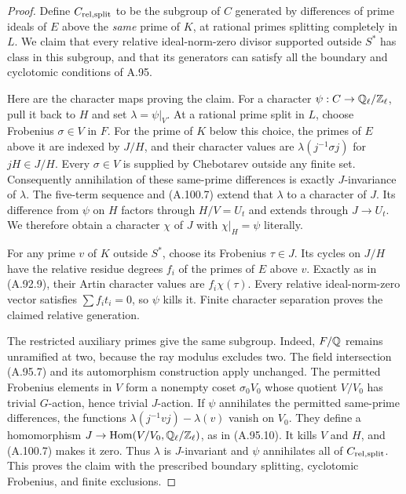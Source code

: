 \begin{proof}
Define $C_{\rm rel,split}$ to be the subgroup of $C$
generated by differences of prime ideals of $E$ above
the \emph{same} prime of $K$, at rational primes
splitting completely in $L$.
We claim that every relative ideal-norm-zero divisor
supported outside $S^*$ has class in this subgroup,
and that its generators can satisfy all the boundary
and cyclotomic conditions of A.95.

Here are the character maps proving the claim.
For a character $\psi:C\to\mathbb Q_\ell/\mathbb Z_\ell$, pull it
back to $H$ and set $\lambda=\psi|_V$.
At a rational prime split in $L$, choose Frobenius
$\sigma\in V$ in $F$.
For the prime of $K$ below this choice, the primes
of $E$ above it are indexed by $J/H$, and their
character values are
$\lambda(j^{-1}\sigma j)$ for $jH\in J/H$.
Every $\sigma\in V$ is supplied by Chebotarev outside
any finite set.
Consequently annihilation of these same-prime
differences is exactly $J$-invariance of $\lambda$.
The five-term sequence and (A.100.7) extend that
$\lambda$ to a character of $J$.
Its difference from $\psi$ on $H$ factors through
$H/V=U_t$ and extends through $J\to U_t$.
We therefore obtain a character $\chi$ of $J$ with
$\chi|_H=\psi$ literally.

For any prime $v$ of $K$ outside $S^*$, choose its
Frobenius $\tau\in J$.
Its cycles on $J/H$ have the relative residue
degrees $f_i$ of the primes of $E$ above $v$.
Exactly as in (A.92.9), their Artin character values
are $f_i\chi(\tau)$.
Every relative ideal-norm-zero vector satisfies
$\sum f_i t_i=0$, so $\psi$ kills it.
Finite character separation proves the claimed
relative generation.

The restricted auxiliary primes give the same subgroup.
Indeed, $F/\mathbb Q$ remains unramified at two, because the
ray modulus excludes two.
The field intersection (A.95.7) and its automorphism
construction apply unchanged.
The permitted Frobenius elements in $V$ form a
nonempty coset $\sigma_0V_0$ whose quotient $V/V_0$
has trivial $G$-action, hence trivial $J$-action.
If $\psi$ annihilates the permitted same-prime
differences, the functions
$\lambda(j^{-1}vj)-\lambda(v)$ vanish on $V_0$.
They define a homomorphism
$J\to\operatorname{Hom}(V/V_0,\mathbb Q_\ell/\mathbb Z_\ell)$,
as in (A.95.10).
It kills $V$ and $H$, and (A.100.7) makes it zero.
Thus $\lambda$ is $J$-invariant and $\psi$ annihilates
all of $C_{\rm rel,split}$.
This proves the claim with the prescribed boundary
splitting, cyclotomic Frobenius, and finite exclusions.


\end{proof}
